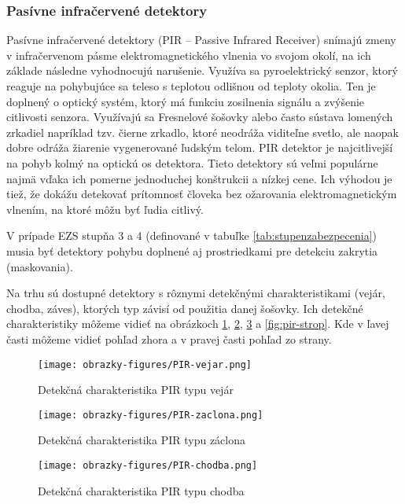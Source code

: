 \subsubsection{Pasívne infračervené detektory}\label{sec:pir}

Pasívne infračervené detektory (PIR – Passive Infrared Receiver) snímajú zmeny v infračervenom pásme elektromagnetického vlnenia vo svojom okolí, na ich základe následne vyhodnocujú narušenie. Využíva sa pyroelektrický senzor, ktorý reaguje na pohybujúce sa teleso s teplotou odlišnou od teploty okolia. Ten je doplnený o optický systém, ktorý má funkciu zosilnenia signálu a zvýšenie citlivosti senzora. Využívajú sa Fresnelové šošovky alebo často sústava lomených zrkadiel napríklad tzv. čierne zrkadlo, ktoré neodráža viditeľne svetlo, ale naopak dobre odráža žiarenie vygenerované ľudským telom. PIR detektor je najcitlivejší na pohyb kolmý na optickú os detektora. Tieto detektory sú veľmi populárne najmä vďaka ich pomerne jednoduchej konštrukcii a nízkej cene. Ich výhodou je tiež, že dokážu detekovať prítomnosť človeka bez ožarovania elektromagnetickým vlnením, na ktoré môžu byť ľudia citlivý.\cite{velas_ezs}

V prípade EZS stupňa 3 a 4 (definované v tabuľke \ref{tab:stupenzabezpecenia}) musia byť detektory pohybu doplnené aj prostriedkami pre detekciu zakrytia (maskovania).\cite{csn-en-50131-1}

Na trhu sú dostupné detektory s rôznymi detekčnými charakteristikami (vejár, chodba, záves),
ktorých typ závisí od použitia danej šošovky. Ich detekčné charakteristiky môžeme vidieť na obrázkoch \ref{fig:pir-vejar}, \ref{fig:pir-zaclona}, \ref{fig:pir-chodba} a \ref{fig:pir-strop}. Kde v ľavej časti môžeme vidieť pohľad zhora a v pravej časti pohľad zo strany.

\begin{figure}[!ht]
    \centering
    \texttt{[image: obrazky-figures/PIR-vejar.png]}
    \caption{Detekčná charakteristika PIR typu vejár\cite{PIR-vejar}}
    \label{fig:pir-vejar}
\end{figure}

\begin{figure}[!ht]
    \centering
    \texttt{[image: obrazky-figures/PIR-zaclona.png]}
    \caption{Detekčná charakteristika PIR typu záclona\cite{velas_ezs}}
    \label{fig:pir-zaclona}
\end{figure}

\begin{figure}[!ht]
    \centering
    \texttt{[image: obrazky-figures/PIR-chodba.png]}
    \caption{Detekčná charakteristika PIR typu chodba\cite{velas_ezs}}
    \label{fig:pir-chodba}
\end{figure}

